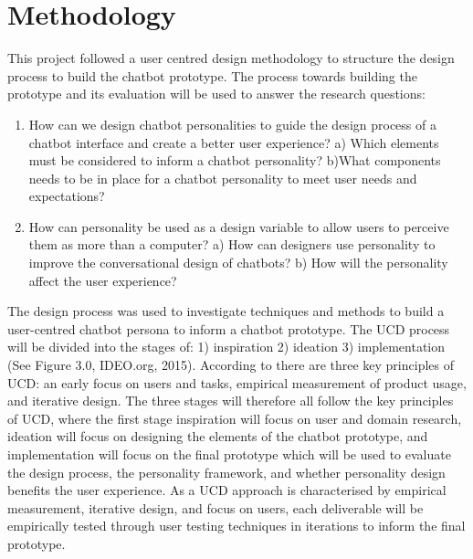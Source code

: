 \chapter{Methodology}
\label{chap:methodology}

This project followed a user centred design methodology to structure the design process to build the chatbot prototype. The process towards building the prototype and its evaluation will be used to answer the research questions:

\begin{enumerate}
    \item How can we design chatbot personalities to guide the design process of a chatbot interface and create a better user experience? 
        \subitem a) Which elements must be considered to inform a chatbot personality?
        \subitem b)What components needs to be in place for a chatbot personality to meet user needs and expectations?
    \item How can personality be used as a design variable to allow users to perceive them as more than a computer?
        \subitem a) How can designers use personality to improve the conversational design of chatbots?
        \subitem b) How will the personality affect the user experience? %
\end{enumerate}

The design process was used to investigate techniques and methods to build a user-centred chatbot persona to inform a chatbot prototype. The UCD process will be divided into the stages of:  1) inspiration 2) ideation 3) implementation (See Figure 3.0, IDEO.org, 2015). According to \cite{Gould1985} there are three key principles of UCD: an early focus on users and tasks, empirical measurement of product usage, and iterative design. The three stages will therefore all follow the key principles of UCD, where the first stage inspiration will focus on user and domain research, ideation will focus on designing the elements of the chatbot prototype, and implementation will focus on the final prototype which will be used to evaluate the design process, the personality framework, and whether personality design benefits the user experience. As a UCD approach is characterised by empirical measurement, iterative design, and focus on users, each deliverable will be empirically tested through user testing techniques in iterations to inform the final prototype.


